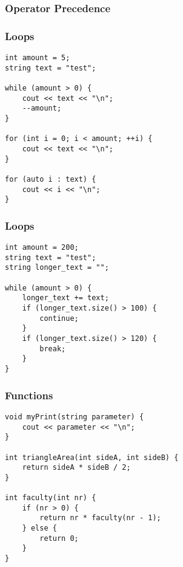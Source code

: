\begin{frame}[fragile]
    \frametitle{Operator Precedence}
\end{frame}

\begin{frame}[fragile]
    \frametitle{Loops}
\begin{lstlisting}
int amount = 5;
string text = "test";

while (amount > 0) {
    cout << text << "\n";
    --amount;
}

for (int i = 0; i < amount; ++i) {
    cout << text << "\n";
}

for (auto i : text) {
    cout << i << "\n";
}
\end{lstlisting}
\end{frame}

\begin{frame}[fragile]
    \frametitle{Loops}
\begin{lstlisting}
int amount = 200;
string text = "test";
string longer_text = "";

while (amount > 0) {
    longer_text += text;
    if (longer_text.size() > 100) {
        continue;
    }
    if (longer_text.size() > 120) {
        break;
    }
}
\end{lstlisting}
\end{frame}

\begin{frame}[fragile]
    \frametitle{Functions}
\begin{lstlisting}
void myPrint(string parameter) {
    cout << parameter << "\n";
}

int triangleArea(int sideA, int sideB) {
    return sideA * sideB / 2;
}

int faculty(int nr) {
    if (nr > 0) {
        return nr * faculty(nr - 1);
    } else {
        return 0;
    }
}
\end{lstlisting}
\end{frame}


